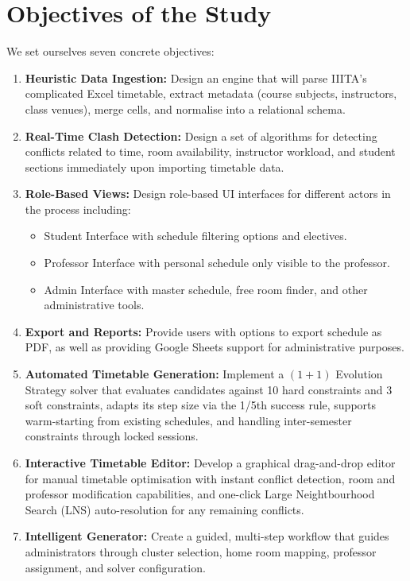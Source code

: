 \section{Objectives of the Study}

We set ourselves seven concrete objectives:

\begin{enumerate}
    \item \textbf{Heuristic Data Ingestion:} Design an engine that will parse IIITA’s complicated Excel timetable, extract metadata (course subjects, instructors, class venues), merge cells, and normalise into a relational schema.
    \item \textbf{Real-Time Clash Detection:} Design a set of algorithms for detecting conflicts related to time, room availability, instructor workload, and student sections immediately upon importing timetable data.
    \item \textbf{Role-Based Views:} Design role-based UI interfaces for different actors in the process including:
    \begin{itemize}
        \item Student Interface with schedule filtering options and electives.
        \item Professor Interface with personal schedule only visible to the professor.
        \item Admin Interface with master schedule, free room finder, and other administrative tools.
    \end{itemize}
    \item \textbf{Export and Reports:} Provide users with options to export schedule as PDF, as well as providing Google Sheets support for administrative purposes.
    \item \textbf{Automated Timetable Generation:} Implement a $(1+1)$ Evolution Strategy solver that evaluates candidates against 10 hard constraints and 3 soft constraints, adapts its step size via the 1/5th success rule, supports warm-starting from existing schedules, and handling inter-semester constraints through locked sessions.
    \item \textbf{Interactive Timetable Editor:} Develop a graphical drag-and-drop editor for manual timetable optimisation with instant conflict detection, room and professor modification capabilities, and one-click Large Neightbourhood Search (LNS) auto-resolution for any remaining conflicts.
    \item \textbf{Intelligent Generator:} Create a guided, multi-step workflow that guides administrators through cluster selection, home room mapping, professor assignment, and solver configuration.
\end{enumerate}


